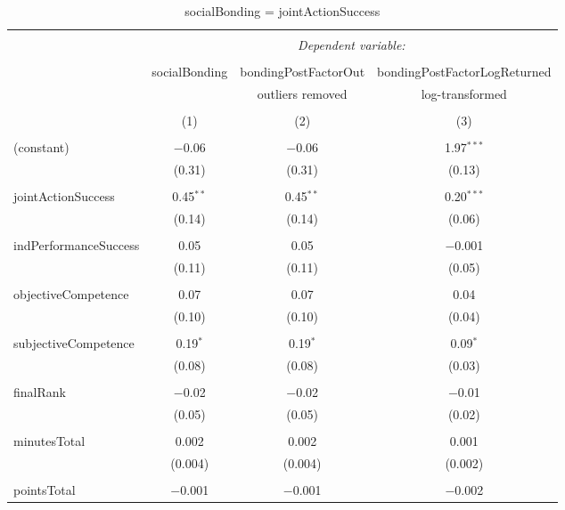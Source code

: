 
\begin{table}[!htbp] \centering 
  \caption{socialBonding = jointActionSuccess} 
  \label{tab:MLM3aJointActionSuccessBonding} 
\footnotesize 
\begin{tabular}{@{\extracolsep{5pt}}lccc} 
\\[-1.8ex]\hline 
\hline \\[-1.8ex] 
 & \multicolumn{3}{c}{\textit{Dependent variable:}} \\ 
\cline{2-4} 
\\[-1.8ex] & socialBonding & bondingPostFactorOut & bondingPostFactorLogReturned \\ 
 &  & outliers removed & log-transformed \\ 
\\[-1.8ex] & (1) & (2) & (3)\\ 
\hline \\[-1.8ex] 
 (constant) & $-$0.06 & $-$0.06 & 1.97$^{***}$ \\ 
  & (0.31) & (0.31) & (0.13) \\ 
  & & & \\ 
 jointActionSuccess & 0.45$^{**}$ & 0.45$^{**}$ & 0.20$^{***}$ \\ 
  & (0.14) & (0.14) & (0.06) \\ 
  & & & \\ 
 indPerformanceSuccess & 0.05 & 0.05 & $-$0.001 \\ 
  & (0.11) & (0.11) & (0.05) \\ 
  & & & \\ 
 objectiveCompetence & 0.07 & 0.07 & 0.04 \\ 
  & (0.10) & (0.10) & (0.04) \\ 
  & & & \\ 
 subjectiveCompetence & 0.19$^{*}$ & 0.19$^{*}$ & 0.09$^{*}$ \\ 
  & (0.08) & (0.08) & (0.03) \\ 
  & & & \\ 
 finalRank & $-$0.02 & $-$0.02 & $-$0.01 \\ 
  & (0.05) & (0.05) & (0.02) \\ 
  & & & \\ 
 minutesTotal & 0.002 & 0.002 & 0.001 \\ 
  & (0.004) & (0.004) & (0.002) \\ 
  & & & \\ 
 pointsTotal & $-$0.001 & $-$0.001 & $-$0.002 \\ 

\end{tabular}
\end{table}
